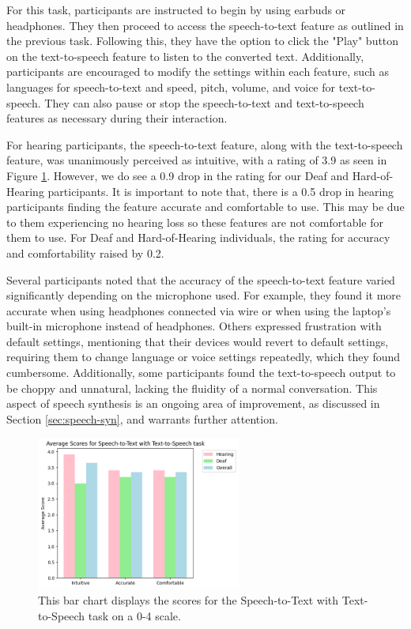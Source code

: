 \documentclass{l4proj}
\begin{document}
For this task, participants are instructed to begin by using earbuds or headphones. They then proceed to access the speech-to-text feature as outlined in the previous task. Following this, they have the option to click the "Play" button on the text-to-speech feature to listen to the converted text. Additionally, participants are encouraged to modify the settings within each feature, such as languages for speech-to-text and speed, pitch, volume, and voice for text-to-speech. They can also pause or stop the speech-to-text and text-to-speech features as necessary during their interaction.

For hearing participants, the speech-to-text feature, along with the text-to-speech feature, was unanimously perceived as intuitive, with a rating of 3.9 as seen in Figure \ref{fig:STT-TTS-chart}. However, we do see a 0.9 drop in the rating for our Deaf and Hard-of-Hearing participants. It is important to note that, there is a 0.5 drop in hearing participants finding the feature accurate and comfortable to use. This may be due to them experiencing no hearing loss so these features are not comfortable for them to use. For Deaf and Hard-of-Hearing individuals, the rating for accuracy and comfortability raised by 0.2. 

Several participants noted that the accuracy of the speech-to-text feature varied significantly depending on the microphone used. For example, they found it more accurate when using headphones connected via wire or when using the laptop's built-in microphone instead of headphones. Others expressed frustration with default settings, mentioning that their devices would revert to default settings, requiring them to change language or voice settings repeatedly, which they found cumbersome. Additionally, some participants found the text-to-speech output to be choppy and unnatural, lacking the fluidity of a normal conversation. This aspect of speech synthesis is an ongoing area of improvement, as discussed in Section \ref{sec:speech-syn}, and warrants further attention. 

\begin{figure}
    \centering
    \includegraphics[width=0.6\textwidth]{dissertation/images/STT-TTS.png}
    \caption{This bar chart displays the scores for the Speech-to-Text with Text-to-Speech task on a 0-4 scale.}
    \label{fig:STT-TTS-chart}
\end{figure}
\end{document}

